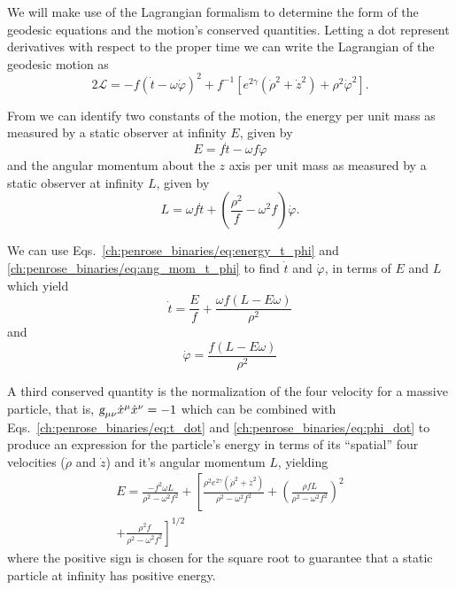 We will make use of the Lagrangian formalism to determine the form of the geodesic equations and the motion's conserved quantities. Letting a dot represent derivatives with respect to the proper time we can write the Lagrangian of the geodesic motion as~\cite{carroll}
%
\begin{equation}
  2\mathcal{L} = -f(\dot{t} - \omega\dot{\varphi})^2 +f^{-1}\left[e^{2\gamma}\left( \dot{\rho}^2 + \dot{z}^2 \right) + \rho^2\dot{\varphi}^2 \right].
  \label{ch:penrose_binaries/eq:lagrangian}
\end{equation}

From  we can identify two constants of the motion, the energy per unit mass as measured by a static observer at infinity $E$, given by
%
\begin{equation}
  E = f\dot{t} - \omega f\dot{\varphi}
  \label{ch:penrose_binaries/eq:energy_t_phi}
\end{equation}
%
and the angular momentum about the $z$ axis per unit mass as measured by a static observer at infinity $L$, given by
%
\begin{equation}
  L = \omega f \dot{t} + \left( \frac{\rho^2}{f} - \omega^2 f \right)\dot{\varphi}.
  \label{ch:penrose_binaries/eq:ang_mom_t_phi}
\end{equation}

We can use Eqs.~\eqref{ch:penrose_binaries/eq:energy_t_phi} and \eqref{ch:penrose_binaries/eq:ang_mom_t_phi} to find $\dot{t}$ and $\dot{\varphi}$, in terms of $E$ and $L$ which yield
%
\begin{equation}
  \dot{t} = \frac{E}{f} + \frac{\omega f (L - E\omega)}{\rho^2}
  \label{ch:penrose_binaries/eq:t_dot}
\end{equation}
%
and
%
\begin{equation}
  \dot{\varphi} = \frac{f (L - E\omega)}{\rho^2}
  \label{ch:penrose_binaries/eq:phi_dot}
\end{equation}

A third conserved quantity is the normalization of the four velocity for a massive particle, that is, $\mtrtens{\mu}{\nu}\dot{x}^\mu\dot{x}^\nu = -1$ which can be combined with Eqs.~\eqref{ch:penrose_binaries/eq:t_dot} and \eqref{ch:penrose_binaries/eq:phi_dot} to produce an expression for the particle's energy in terms of its ``spatial'' four velocities ($\dot{\rho}$ and $\dot{z}$) and it's angular momentum $L$, yielding
%
\begin{multline}
  E = \frac{-f^2\omega L}{\rho^2-\omega^2 f^2} + \left[ \frac{\rho^2e^{2\gamma}(\dot{\rho}^2 + \dot{z}^2)}{\rho^2 - \omega^2f^2} + \left( \frac{\rho fL}{\rho^2 - \omega^2f^2} \right)^2 \right. \\
  \left. + \frac{\rho^2f}{\rho^2 - \omega^2f^2} \right]^{1/2}
  \label{ch:penrose_binaries/eq:energy_rho_z}
\end{multline}
%
where the positive sign is chosen for the square root to guarantee that a static particle at infinity has positive energy.

